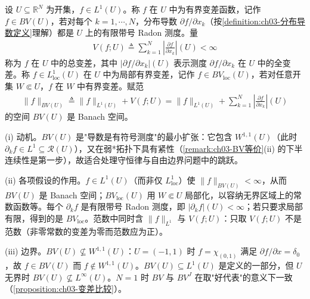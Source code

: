 \documentclass[../../main.tex]{subfiles}%
\begin{document}
\begin{definition}\label{definition:ch03-BV}
设 $U\subseteq\mathbb{R}^N$ 为开集，$f\in L^1(U)$。称 $f$ 在 $U$ 中为有界变差函数，记作 $f\in BV(U)$，若对每个 $k=1,\cdots ,N$，分布导数 $\partial f/\partial x_k$（按\cref{definition:ch03-分布导数定义}理解）都是 $U$ 上的有限带号 Radon 测度。量
\begin{align}
V(f;U)\triangleq \sum_{k=1}^N\left|\frac{\partial f}{\partial x_k}\right|(U)<\infty\label{align:ch03-3.13}
\end{align}
称为 $f$ 在 $U$ 中的总变差，其中 $|\partial f/\partial x_k|(U)$ 表示测度 $\partial f/\partial x_k$ 在 $U$ 中的全变差。称 $f\in L^1_{\mathrm{loc}}(U)$ 在 $U$ 中为局部有界变差，记作 $f\in BV_{\mathrm{loc}}(U)$，若对任意开集 $W\Subset U$，$f$ 在 $W$ 中有界变差。赋范
\begin{align*}
\|f\|_{BV(U)}\triangleq \|f\|_{L^1(U)}+V(f;U)
=\|f\|_{L^1(U)}+\sum_{k=1}^N\left|\frac{\partial f}{\partial x_k}\right|(U)
\end{align*}
的空间 $BV(U)$ 是 Banach 空间。
\end{definition}

\begin{remark}\label{remark:ch03-BV定义动机}
(i) 动机。$BV(U)$ 是"导数是有符号测度"的最小扩张：它包含 $W^{1,1}(U)$（此时 $\partial_kf\in L^1\subseteq\mathscr{R}(U)$），又在弱*拓扑下具有紧性（\cref{remark:ch03-BV等价}(ii) 的下半连续性是第一步），故适合处理守恒律与自由边界问题中的跳跃。

(ii) 各项假设的作用。$f\in L^1(U)$（而非仅 $L^1_{\mathrm{loc}}$）使 $\|f\|_{BV(U)}<\infty$，从而 $BV(U)$ 是 Banach 空间；$BV_{\mathrm{loc}}(U)$ 用 $W\Subset U$ 局部化，以容纳无界区域上的常数函数等。每个 $\partial_kf$ 是有限带号 Radon 测度，即 $|\partial_kf|(U)<\infty$；若只要求局部有限，得到的是 $BV_{\mathrm{loc}}$。范数中同时含 $\|f\|_{L^1}$ 与 $V(f;U)$：只取 $V(f;U)$ 不是范数（非零常数的变差为零而范数应为正）。

(iii) 边界。$BV(U)\not\subseteq W^{1,1}(U)$：$U=(-1,1)$ 时 $f=\chi_{(0,1)}$ 满足 $\partial f/\partial x=\delta_0$，故 $f\in BV(U)$ 而 $f\notin W^{1,1}(U)$。$BV(U)\subseteq L^1(U)$ 是定义的一部分，但 $U$ 无界时 $BV(U)\not\subseteq L^\infty(U)$。$N=1$ 时 $BV$ 与 $BV^J$ 在取"好代表"的意义下一致（\cref{proposition:ch03-变差比较}）。
\end{remark}
\end{document}
